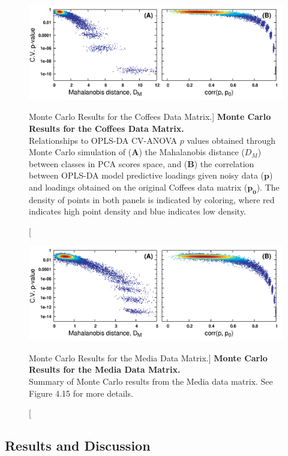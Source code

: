 \begin{figure}[ht!]
\includegraphics[width=6in]{figs/apps/15-scatter-a.png}
\caption
      [Monte Carlo Results for the Coffees Data Matrix.]{
  {\bf Monte Carlo Results for the Coffees Data Matrix.}
  \\
  Relationships to OPLS-DA CV-ANOVA $p$ values obtained through Monte Carlo
  simulation of ({\bf A}) the Mahalanobis distance ($D_M$) between classes
  in PCA scores space, and ({\bf B}) the correlation between OPLS-DA model
  predictive loadings given noisy data ($\mathbf{p}$) and loadings obtained
  on the original Coffees data matrix ($\mathbf{p_0}$). The density of points
  in both panels is indicated by coloring, where red indicates high point
  density and blue indicates low density.
}
\label{figure.4.15}
\end{figure}

\begin{figure}[ht!]
\includegraphics[width=6in]{figs/apps/16-scatter-b.png}
\caption
      [Monte Carlo Results for the Media Data Matrix.]{
  {\bf Monte Carlo Results for the Media Data Matrix.}
  \\
  Summary of Monte Carlo results from the Media data matrix. See Figure
  4.15 for more details.
}
\label{figure.4.16}
\end{figure}

\subsection{Results and Discussion}

